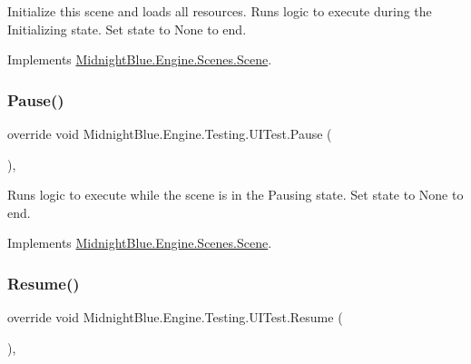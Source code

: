 Initialize this scene and loads all resources. Runs logic to execute during the Initializing state. Set state to None to end. 



Implements \hyperlink{class_midnight_blue_1_1_engine_1_1_scenes_1_1_scene_aa919101862c14384b955d91a4d3362ab}{Midnight\+Blue.\+Engine.\+Scenes.\+Scene}.

\hypertarget{class_midnight_blue_1_1_engine_1_1_testing_1_1_u_i_test_ae7b12fd4ac0f143158c750c45e0775ce}{}\label{class_midnight_blue_1_1_engine_1_1_testing_1_1_u_i_test_ae7b12fd4ac0f143158c750c45e0775ce} 
\subsubsection{\texorpdfstring{Pause()}{Pause()}}
{\footnotesize\ttfamily override void Midnight\+Blue.\+Engine.\+Testing.\+U\+I\+Test.\+Pause (\begin{DoxyParamCaption}{ }\end{DoxyParamCaption})\hspace{0.3cm}{\ttfamily [inline]}, {\ttfamily [virtual]}}



Runs logic to execute while the scene is in the Pausing state. Set state to None to end. 



Implements \hyperlink{class_midnight_blue_1_1_engine_1_1_scenes_1_1_scene_aeb3c4d9bea0177d21fbffcdabab660de}{Midnight\+Blue.\+Engine.\+Scenes.\+Scene}.

\hypertarget{class_midnight_blue_1_1_engine_1_1_testing_1_1_u_i_test_a0c0ac7a8acf10482982ee63756605f61}{}\label{class_midnight_blue_1_1_engine_1_1_testing_1_1_u_i_test_a0c0ac7a8acf10482982ee63756605f61} 
\subsubsection{\texorpdfstring{Resume()}{Resume()}}
{\footnotesize\ttfamily override void Midnight\+Blue.\+Engine.\+Testing.\+U\+I\+Test.\+Resume (\begin{DoxyParamCaption}{ }\end{DoxyParamCaption})\hspace{0.3cm}{\ttfamily [inline]}, {\ttfamily [virtual]}}



